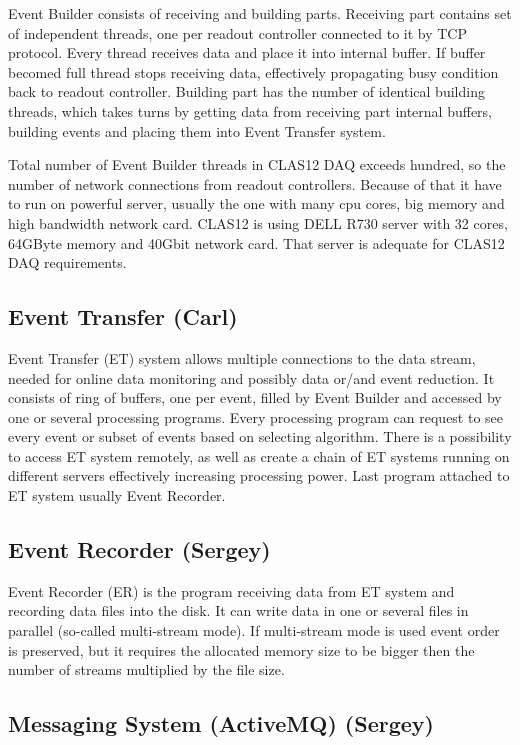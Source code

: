 Event Builder consists of receiving and building parts. Receiving part contains set of independent threads, one per readout controller connected to it by TCP protocol. Every thread receives data and place it into internal buffer. If buffer becomed full thread stops receiving data, effectively propagating busy condition back to readout controller.
Building part has the number of identical building threads, which takes turns by getting data from receiving part internal buffers, building events and placing them into Event Transfer system.

Total number of Event Builder threads in CLAS12 DAQ exceeds hundred, so the number of network connections from readout controllers. Because of that it have to run on powerful server, usually the one with many cpu cores, big memory and high bandwidth network card. CLAS12 is using DELL R730 server with 32 cores, 64GByte memory and 40Gbit network card. That server is adequate for CLAS12 DAQ requirements.


\subsection{Event Transfer (Carl)}

Event Transfer (ET) system allows multiple connections to the data stream, needed for online data monitoring and possibly data or/and event reduction. It consists of ring of buffers, one per event, filled by Event Builder and accessed by one or several processing programs. Every processing program can request to see every event or subset of events based on selecting algorithm. There is a possibility to access ET system remotely, as well as create a chain of ET systems running on different servers effectively increasing processing power. Last program attached to ET system usually Event Recorder.

\subsection{Event Recorder (Sergey)}

Event Recorder (ER) is the program receiving data from ET system and recording data files into the disk. It can write data in one or several files in parallel (so-called multi-stream mode). If multi-stream mode is used event order is preserved, but it requires the allocated memory size to be bigger then the number of streams multiplied by the file size.


\subsection{Messaging System (ActiveMQ) (Sergey)}

